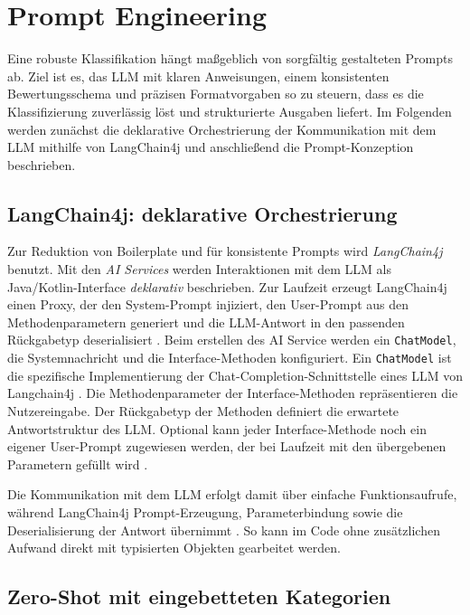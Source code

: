 \section{Prompt Engineering}\label{sec:prompt-engineering}

Eine robuste Klassifikation hängt maßgeblich von sorgfältig gestalteten Prompts ab. Ziel ist es, das \ac{LLM} mit klaren Anweisungen, einem konsistenten Bewertungsschema und präzisen Formatvorgaben so zu steuern, dass es die Klassifizierung zuverlässig löst und strukturierte Ausgaben liefert. Im Folgenden werden zunächst die deklarative Orchestrierung der Kommunikation mit dem \ac{LLM} mithilfe von LangChain4j und anschließend die Prompt-Konzeption beschrieben.

\subsection*{LangChain4j: deklarative Orchestrierung}
Zur Reduktion von Boilerplate und für konsistente Prompts wird \emph{LangChain4j} \cite{langchain4j} benutzt. Mit den \emph{AI Services} werden Interaktionen mit dem \ac{LLM} als Java/Kotlin-Interface \emph{deklarativ} beschrieben. Zur Laufzeit erzeugt LangChain4j einen Proxy, der den System-Prompt injiziert, den User-Prompt aus den Methodenparametern generiert und die \ac{LLM}-Antwort in den passenden Rückgabetyp deserialisiert \cite{langchain4j-ai-services}. Beim erstellen des AI Service werden ein \texttt{ChatModel}, die Systemnachricht und die Interface-Methoden konfiguriert. Ein \texttt{ChatModel} ist die spezifische Implementierung der Chat-Completion-Schnittstelle eines \ac{LLM} von Langchain4j \cite{langchain4j-chat-model}. Die Methodenparameter der Interface-Methoden repräsentieren die Nutzereingabe. Der Rückgabetyp der Methoden definiert die erwartete Antwortstruktur des \ac{LLM}. Optional kann jeder Interface-Methode noch ein eigener User-Prompt zugewiesen werden, der bei Laufzeit mit den übergebenen Parametern gefüllt wird \cite{langchain4j-ai-services}.

Die Kommunikation mit dem \ac{LLM} erfolgt damit über einfache Funktionsaufrufe, während LangChain4j Prompt-Erzeugung, Parameterbindung sowie die Deserialisierung der Antwort übernimmt \cite{langchain4j-ai-services}. So kann im Code ohne zusätzlichen Aufwand direkt mit typisierten Objekten gearbeitet werden.

\subsection*{Zero-Shot mit eingebetteten Kategorien}


